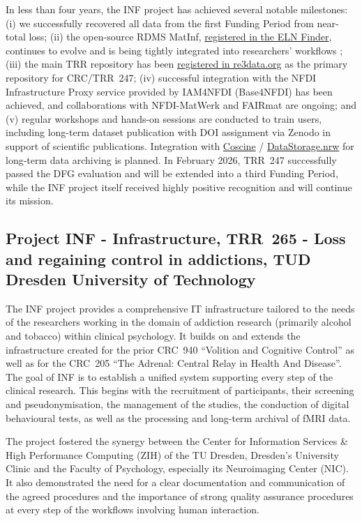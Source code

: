 \documentclass{eceasst}
\begin{document}
In less than four years, the INF project has achieved several notable milestones: (i) we successfully recovered all data from the first Funding Period from near-total loss; (ii) the open-source RDMS MatInf, \href{https://eln-finder.ulb.tu-darmstadt.de/items/8aefad94-9f2d-4b40-b94f-21c9419eb3be}{registered in the ELN Finder}, continues to evolve and is being tightly integrated into researchers’ workflows \cite{Dudarev2025}; (iii) the main TRR repository has been \href{https://doi.org/10.17616/R31NJNUG}{registered in re3data.org} as the primary repository for CRC/TRR~247; (iv) successful integration with the NFDI Infrastructure Proxy service provided by IAM4NFDI (Base4NFDI) has been achieved, and collaborations with NFDI-MatWerk and FAIRmat are ongoing; and (v) regular workshops and hands-on sessions are conducted to train users, including long-term dataset publication with DOI assignment via Zenodo in support of scientific publications.
Integration with \href{https://about.coscine.de/}{Coscine} / \href{https://about.coscine.de/news/post-30/}{DataStorage.nrw} for long-term data archiving is planned.
In February 2026, TRR~247 successfully passed the DFG evaluation and will be extended into a third Funding Period, while the INF project itself received highly positive recognition and will continue its mission.

\subsection{Project INF - Infrastructure, TRR~265 - Loss and regaining control in addictions, TUD Dresden University of Technology}
\label{subsec:trr265}
The INF project provides a comprehensive IT infrastructure tailored to the needs of the researchers working in the domain of addiction research (primarily alcohol and tobacco) within clinical psychology.
It builds on and extends the infrastructure created for the prior CRC~940 ``Volition and Cognitive Control'' as well as for the CRC~205 ``The Adrenal: Central Relay in Health And Disease''.
The goal of INF is to establish a unified system supporting every step of the clinical research.
This begins with the recruitment of participants, their screening and pseudonymisation, the management of the studies, the conduction of digital behavioural tests, as well as the processing and long-term archival of fMRI data.

The project fostered the synergy between the Center for Information Services \& High Performance Computing (ZIH) of the TU Dresden, Dresden's University Clinic and the Faculty of Psychology, especially its Neuroimaging Center (NIC).
It also demonstrated the need for a clear documentation and communication of the agreed procedures and the importance of strong quality assurance procedures at every step of the workflows involving human interaction.
\end{document}
